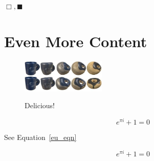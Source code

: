 \documentclass{article}
\begin{document}
$\Box, \blacksquare$


\section{Even More Content}

\begin{figure}[H]
    \centering
    \includegraphics[width=4cm]{homotopy}
    \label{fig:myname}
    \caption{Delicious!}
\end{figure}    

\begin{equation} \label{eu_eqn}
    e^{\pi i} + 1 = 0
\end{equation}

See Equation~\ref{eu_eqn} 

\begin{equation*}
	\boxed{e^{\pi i} + 1 = 0}
\end{equation*}
\end{document}
